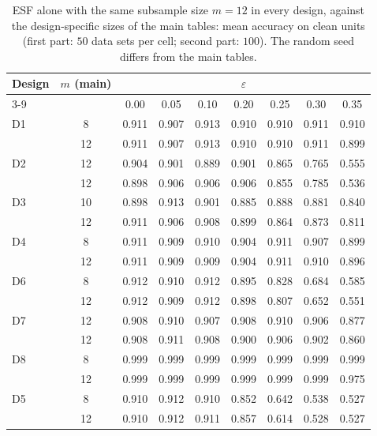 \begin{table}[htbp]
\centering
\small
\caption{ESF alone with the same subsample size $m=12$ in every design, against the design-specific sizes of the main tables: mean accuracy on clean units (first part: $50$ data sets per cell; second part: $100$). The random seed differs from the main tables.}
\label{tab:S15}
\begin{tabular}{lcccccccc}
\toprule
Design & $m$ (main) & \multicolumn{7}{c}{$\varepsilon$} \\
\cmidrule(lr){3-9}
 & & 0.00 & 0.05 & 0.10 & 0.20 & 0.25 & 0.30 & 0.35 \\
\midrule
D1 & 8 & 0.911 & 0.907 & 0.913 & 0.910 & 0.910 & 0.911 & 0.910 \\
 & 12 & 0.911 & 0.907 & 0.913 & 0.910 & 0.910 & 0.911 & 0.899 \\
D2 & 12 & 0.904 & 0.901 & 0.889 & 0.901 & 0.865 & 0.765 & 0.555 \\
 & 12 & 0.898 & 0.906 & 0.906 & 0.906 & 0.855 & 0.785 & 0.536 \\
D3 & 10 & 0.898 & 0.913 & 0.901 & 0.885 & 0.888 & 0.881 & 0.840 \\
 & 12 & 0.911 & 0.906 & 0.908 & 0.899 & 0.864 & 0.873 & 0.811 \\
D4 & 8 & 0.911 & 0.909 & 0.910 & 0.904 & 0.911 & 0.907 & 0.899 \\
 & 12 & 0.911 & 0.909 & 0.909 & 0.904 & 0.911 & 0.910 & 0.896 \\
D6 & 8 & 0.912 & 0.910 & 0.912 & 0.895 & 0.828 & 0.684 & 0.585 \\
 & 12 & 0.912 & 0.909 & 0.912 & 0.898 & 0.807 & 0.652 & 0.551 \\
D7 & 12 & 0.908 & 0.910 & 0.907 & 0.908 & 0.910 & 0.906 & 0.877 \\
 & 12 & 0.908 & 0.911 & 0.908 & 0.900 & 0.906 & 0.902 & 0.860 \\
D8 & 8 & 0.999 & 0.999 & 0.999 & 0.999 & 0.999 & 0.999 & 0.999 \\
 & 12 & 0.999 & 0.999 & 0.999 & 0.999 & 0.999 & 0.999 & 0.975 \\
D5 & 8 & 0.910 & 0.912 & 0.910 & 0.852 & 0.642 & 0.538 & 0.527 \\
 & 12 & 0.910 & 0.912 & 0.911 & 0.857 & 0.614 & 0.528 & 0.527 \\
\bottomrule
\end{tabular}
\end{table}